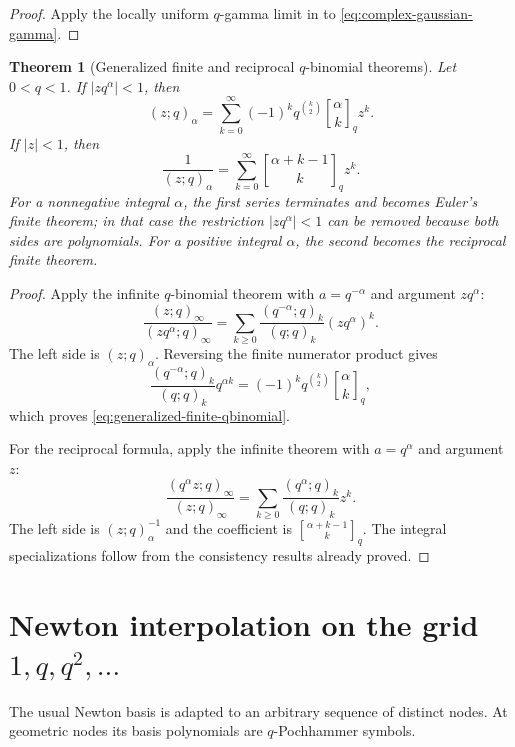 \documentclass[11pt,oneside,openany]{book}
\newtheorem{theorem}{Theorem}[chapter]
\theoremstyle{definition}
\theoremstyle{remark}
\newcommand{\abs}[1]{\lvert #1\rvert}
\begin{document}
\begin{proof}
Apply the locally uniform $q$-gamma limit in  to \eqref{eq:complex-gaussian-gamma}.
\end{proof}

\begin{theorem}[Generalized finite and reciprocal $q$-binomial theorems]\label{thm:generalized-qbinomial}
Let $0<q<1$.  If $\abs{zq^\alpha}<1$, then
\[
 (z;q)_\alpha
 =\sum_{k=0}^{\infty}(-1)^kq^{\binom k2}
   \genfrac{[}{]}{0pt}{}{\alpha}{k}_q z^k.
 \tag{17.13}\label{eq:generalized-finite-qbinomial}
\]
If $\abs z<1$, then
\[
 \frac1{(z;q)_\alpha}
 =\sum_{k=0}^{\infty}
   \genfrac{[}{]}{0pt}{}{\alpha+k-1}{k}_q z^k.
 \tag{17.14}\label{eq:generalized-reciprocal-qbinomial}
\]
For a nonnegative integral $\alpha$, the first series terminates and becomes Euler's finite theorem; in that case the restriction $\abs{zq^\alpha}<1$ can be removed because both sides are polynomials.  For a positive integral $\alpha$, the second becomes the reciprocal finite theorem.
\end{theorem}

\begin{proof}
Apply the infinite $q$-binomial theorem with
\(
 a=q^{-\alpha}
\)
and argument $zq^\alpha$:
\[
 \frac{(z;q)_\infty}{(zq^\alpha;q)_\infty}
 =\sum_{k\ge0}\frac{(q^{-\alpha};q)_k}{(q;q)_k}
 (zq^\alpha)^k.
\]
The left side is $(z;q)_\alpha$.  Reversing the finite numerator product gives
\[
 \frac{(q^{-\alpha};q)_k}{(q;q)_k}q^{\alpha k}
 =(-1)^kq^{\binom k2}
   \genfrac{[}{]}{0pt}{}{\alpha}{k}_q,
\]
which proves \eqref{eq:generalized-finite-qbinomial}.

For the reciprocal formula, apply the infinite theorem with $a=q^\alpha$ and argument $z$:
\[
 \frac{(q^\alpha z;q)_\infty}{(z;q)_\infty}
 =\sum_{k\ge0}\frac{(q^\alpha;q)_k}{(q;q)_k}z^k.
\]
The left side is $(z;q)_\alpha^{-1}$ and the coefficient is
$\genfrac{[}{]}{0pt}{}{\alpha+k-1}{k}_q$.  The integral specializations follow from the consistency results already proved.
\end{proof}

\section{Newton interpolation on the grid \texorpdfstring{$1,q,q^2,\ldots$}{1, q, q-squared, ...}}

The usual Newton basis is adapted to an arbitrary sequence of distinct nodes.  At geometric nodes its basis polynomials are $q$-Pochhammer symbols.
\end{document}
